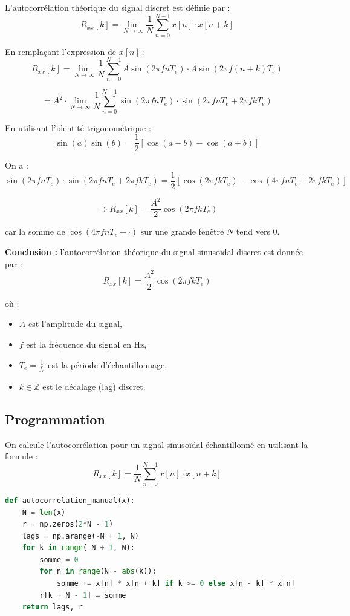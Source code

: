 L'autocorrélation théorique du signal discret est définie par :
\[
R_{xx}[k] = \lim_{N \to \infty} \frac{1}{N} \sum_{n=0}^{N-1} x[n] \cdot x[n+k]
\]

En remplaçant l’expression de \( x[n] \) :
\[
R_{xx}[k] = \lim_{N \to \infty} \frac{1}{N} \sum_{n=0}^{N-1} A \sin(2\pi f n T_e) \cdot A \sin(2\pi f (n + k) T_e)
\]

\[
= A^2 \cdot \lim_{N \to \infty} \frac{1}{N} \sum_{n=0}^{N-1} \sin(2\pi f n T_e) \cdot \sin(2\pi f n T_e + 2\pi f k T_e)
\]

En utilisant l'identité trigonométrique :
\[
\sin(a)\sin(b) = \frac{1}{2} [\cos(a - b) - \cos(a + b)]
\]

On a :
\[
\sin(2\pi f n T_e) \cdot \sin(2\pi f n T_e + 2\pi f k T_e) = \frac{1}{2} \left[ \cos(2\pi f k T_e) - \cos(4\pi f n T_e + 2\pi f k T_e) \right]
\]

\[
\Rightarrow R_{xx}[k] = \frac{A^2}{2} \cos(2\pi f k T_e)
\]

car la somme de \( \cos(4\pi f n T_e + \cdot) \) sur une grande fenêtre \( N \) tend vers 0.

\textbf{Conclusion :} l'autocorrélation théorique du signal sinusoïdal discret est donnée par :
\[
\boxed{R_{xx}[k] = \frac{A^2}{2} \cos(2\pi f k T_e)}
\]

où :
\begin{itemize}
  \item \( A \) est l’amplitude du signal,
  \item \( f \) est la fréquence du signal en Hz,
  \item \( T_e = \frac{1}{f_e} \) est la période d’échantillonnage,
  \item \( k \in \mathbb{Z} \) est le décalage (lag) discret.
\end{itemize}

\subsection{Programmation}

On calcule l'autocorrélation pour un signal sinusoïdal échantillonné en utilisant la formule : 
\[
R_{xx}[k] = \frac{1}{N} \sum_{n=0}^{N-1} x[n] \cdot x[n+k]
\]

\begin{lstlisting}[language=Python]
    def autocorrelation_manual(x):
    N = len(x)
    r = np.zeros(2*N - 1)
    lags = np.arange(-N + 1, N)
    for k in range(-N + 1, N):
        somme = 0
        for n in range(N - abs(k)):
            somme += x[n] * x[n + k] if k >= 0 else x[n - k] * x[n]
        r[k + N - 1] = somme
    return lags, r
\end{lstlisting}

